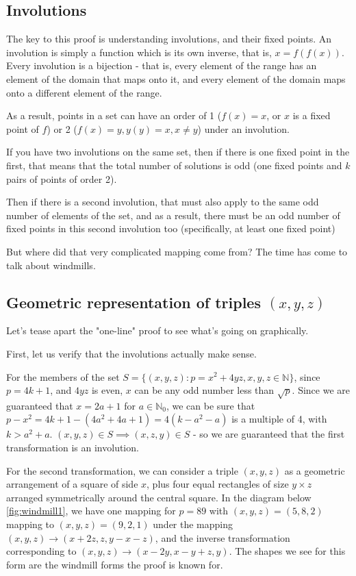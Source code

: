 \documentclass{article}
\begin{document}
\subsection{Involutions}

The key to this proof is understanding involutions, and their fixed points. An involution
is simply a function which is its own inverse, that is, $x = f(f(x))$. Every involution is
a bijection - that is, every element of the range has an element of the domain that maps
onto it, and every element of the domain maps onto a different element of the range.

As a result, points in a set can have an order of 1 ($f(x)=x$, or $x$ is a fixed point
of $f$) or 2 ($f(x)=y, y(y)=x, x\neq y$) under an involution.

If you have two involutions on the same set, then if there is one fixed point in the first,
that means that the total number of solutions is odd (one fixed points and $k$ pairs of
points of order 2).

Then if there is a second involution, that must also apply to the same odd number of
elements of the set, and as a result, there must be an odd number of fixed points in this second involution too (specifically, at least one fixed point)

But where did that very complicated mapping come from? The time has come to talk about
windmills.

\subsection{Geometric representation of triples $(x,y,z)$}

Let's tease apart the "one-line" proof to see what's going on graphically.

First, let us verify that the involutions actually make sense.

For the members of the set $S=\{(x,y,z):p=x^2+4yz, x, y, z \in \mathbb{N}\}$, since
$p = 4k+1$, and $4yz$ is even, $x$ can be any odd number less than
$\sqrt{p}$. Since we are guaranteed that $x=2a+1$ for $a\in \mathbb{N}_0$, we can be
sure that $p-x^2 = 4k+1 -(4a^2+4a+1) = 4(k-a^2-a)$ is a multiple of 4, with $k>a^2+a$.
$(x,y,z) \in S \implies (x,z,y) \in S$ - so we are guaranteed that the first
transformation is an involution.

For the second transformation, we can consider a triple $(x,y,z)$ as a geometric
arrangement of a square of side $x$, plus four equal rectangles of size $y\times z$
arranged symmetrically around the central square. In the diagram below \ref{fig:windmill1},
we have one mapping for $p=89$ with $(x,y,z)=(5,8,2)$ mapping to $(x,y,z)=(9,2,1)$ under the
mapping $(x,y,z) \to (x+2z,z,y-x-z)$, and the inverse transformation corresponding
to $(x,y,z) \to (x-2y,x-y+z,y)$. The shapes we see for this form are the windmill
forms the proof is known for.
\end{document}
